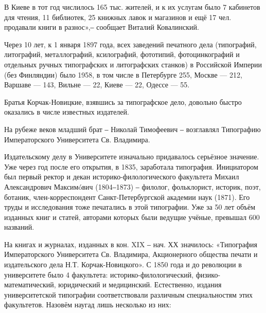 \vspace{0.5cm}

В Киеве в тот год числилось 165 тыс. жителей, и к их услугам было 7 кабинетов
для чтения, 11 библиотек, 25 книжных лавок и магазинов и ещё 17 чел. продавали
книги в разнос»,‒ сообщает  Виталий Ковалинский.

Через 10 лет, к 1 января 1897 года, всех заведений печатного дела (типографий,
литографий, металлографий, ксилографий, фототипий, фотоцинкографий и отдельных
ручных типографских и литографских станков) в Российской Империи (без
Финляндии) было 1958, в том числе в Петербурге 255, Москве — 212, Варшаве —
143, Вильне — 22, Киеве — 22, Одессе — 55.

Братья Корчак-Новицкие, взявшись за типографское дело, довольно быстро
оказались в числе известных издателей.

На рубеже веков младший брат ‒ Николай Тимофеевич ‒ возглавлял Типографию
Императорского Университета Св. Владимира. 

\vspace{0.5cm}

Издательскому делу в Университете изначально придавалось серьёзное значение.
Уже через год после его открытия, в 1835, заработала типография. Инициатором
был первый ректор и декан историко-филологического факультета Михаил
Александрович Максимóвич (1804‒1873) ‒ филолог, фольклорист, историк, поэт,
ботаник, член-корреспондент Санкт-Петербургской академии наук (1871). Его труды
и исследования тоже печатались в этой типографии. Уже за 50 лет объём изданных
книг и статей, авторами которых были ведущие учёные, превышал 600 названий. 

На книгах и журналах, изданных в кон. XIX ‒ нач. ХХ значилось: «Типография
Императорского Университета Св. Владимира, Акционерного общества печати и
издательского дела Н.Т. Корчак-Новицкого». С 1850 года и до революции в
университете было 4 факультета: историко-филологический, физико-математический,
юридический и медицинский. Естественно, издания университетской типографии
соответствовали различным специальностям этих факультетов. Назовём наугад лишь
несколько из них:

